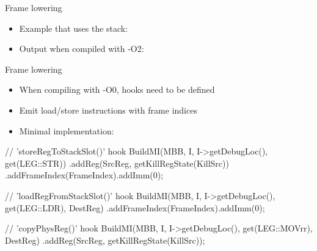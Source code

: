 
\begin{frame}{Frame lowering}

\begin{itemize}
    \item Example that uses the stack:
\end{itemize}


\begin{itemize}
    \item Output when compiled with -O2:
\end{itemize}


\end{frame}


\begin{frame}[fragile]{Frame lowering}

\begin{itemize}
    \item When compiling with  -O0, hooks need to be defined
    \item Emit load/store instructions with frame indices
    \item Minimal implementation:
\end{itemize}

\begin{codebox}
// 'storeRegToStackSlot()' hook
BuildMI(MBB, I, I->getDebugLoc(), get(LEG::STR))
  .addReg(SrcReg, getKillRegState(KillSrc))
  .addFrameIndex(FrameIndex).addImm(0);
\end{codebox}

\begin{codebox}
// 'loadRegFromStackSlot()' hook
BuildMI(MBB, I, I->getDebugLoc(), get(LEG::LDR), DestReg)
  .addFrameIndex(FrameIndex).addImm(0);
\end{codebox}

\begin{codebox}
// 'copyPhysReg()' hook
BuildMI(MBB, I, I->getDebugLoc(), get(LEG::MOVrr), DestReg)
  .addReg(SrcReg, getKillRegState(KillSrc));
\end{codebox}

\end{frame}

